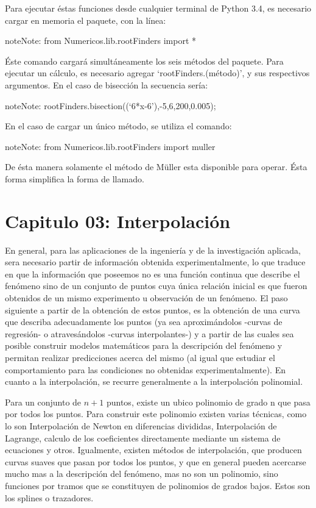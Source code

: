 \documentclass[letterpaper,10pt,oneside]{sphinxmanual}
\theoremstyle{plain}%
\theoremstyle{definition}%
\theoremstyle{remark}%
\begin{document}
Para ejecutar éstas funciones desde cualquier terminal de Python 3.4, es necesario cargar en memoria el paquete, con la línea:

\begin{notice}{note}{Note:}
from Numericos.lib.rootFinders import *
\end{notice}

Éste comando cargará simultáneamente los seis métodos del paquete. Para ejecutar un cálculo, es necesario agregar `rootFinders.(método)',
y sus respectivos argumentos. En el caso de bisección la secuencia sería:

\begin{notice}{note}{Note:}
rootFinders.bisection((`6*x-6'),-5,6,200,0.005);
\end{notice}

En el caso de cargar un único método, se utiliza el comando:

\begin{notice}{note}{Note:}
from Numericos.lib.rootFinders import muller
\end{notice}

De ésta manera solamente el método de Müller esta disponible para operar. Ésta forma simplifica la forma de llamado.


\chapter{Capitulo 03: Interpolación}
\label{chapter03::doc}\label{chapter03:capitulo-03-Interpolación}

\noindent En general, para las aplicaciones de la ingeniería y de la investigación aplicada, sera necesario partir de información obtenida experimentalmente, lo que traduce en que la información que poseemos no es una función continua que describe el fenómeno sino de un conjunto de puntos cuya única relación inicial es que fueron obtenidos de un mismo experimento u observación de un fenómeno. El paso siguiente a partir de la obtención de estos puntos, es la obtención de una curva que describa adecuadamente los puntos (ya sea aproximándolos -curvas de regresión- o atravesándolos -curvas interpolantes-) y a partir de las cuales sea posible
construir modelos matemáticos para la descripción del fenómeno y permitan realizar predicciones acerca del mismo (al igual que estudiar el comportamiento para las condiciones no obtenidas experimentalmente). En cuanto a la interpolación, se recurre generalmente a la interpolación polinomial.\medskip

\noindent Para un conjunto de $n + 1$ puntos, existe un ubico polinomio de grado n que pasa por todos los puntos. Para construir este polinomio existen varias técnicas, como lo son Interpolación de Newton en diferencias divididas, Interpolación de Lagrange, calculo de los coeficientes directamente mediante un sistema de ecuaciones y otros. Igualmente, existen métodos de interpolación, que producen curvas suaves que pasan por todos los puntos, y que en general pueden acercarse mucho mas a la descripción del fenómeno, mas no son un polinomio, sino funciones por tramos que se constituyen de polinomios de grados bajos. Estos son los splines o trazadores.\medskip
\end{document}
